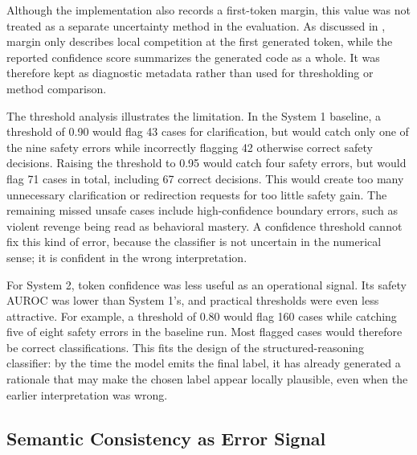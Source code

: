 
Although the implementation also records a first-token margin, this value was not
treated as a separate uncertainty method in the evaluation. As discussed in
, margin only describes local competition at the first
generated token, while the reported confidence score summarizes the generated code as a
whole. It was therefore kept as diagnostic metadata rather than used for thresholding or
method comparison.

The threshold analysis illustrates the limitation. In the System 1 baseline, a
threshold of 0.90 would flag 43 cases for clarification, but would catch only one of
the nine safety errors while incorrectly flagging 42 otherwise correct safety
decisions. Raising the threshold to 0.95 would catch four safety errors, but would
flag 71 cases in total, including 67 correct decisions. This would create too many
unnecessary clarification or redirection requests for too little safety gain. The
remaining missed unsafe cases include high-confidence boundary errors, such as violent
revenge being read as behavioral mastery. A confidence threshold cannot fix this kind
of error, because the classifier is not uncertain in the numerical sense; it is
confident in the wrong interpretation.

For System 2, token confidence was less useful as an operational signal. Its safety
AUROC was lower than System 1's, and practical thresholds were even less attractive.
For example, a threshold of 0.80 would flag 160 cases while catching five of eight
safety errors in the baseline run. Most flagged cases would therefore be correct
classifications. This fits the design of the structured-reasoning classifier: by the
time the model emits the final label, it has already generated a rationale that may
make the chosen label appear locally plausible, even when the earlier interpretation
was wrong.

\subsection{Semantic Consistency as Error Signal}

